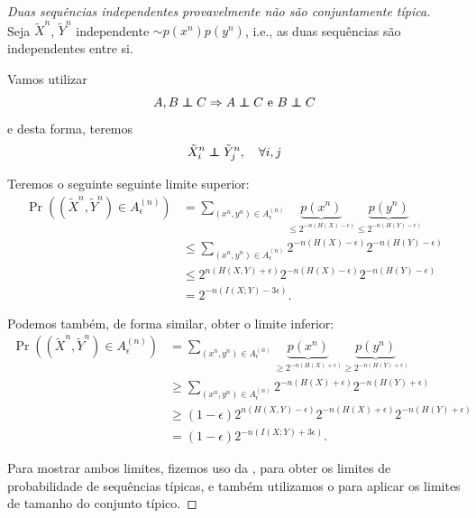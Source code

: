   \begin{proof}[Duas sequências independentes provavelmente não são conjuntamente típica] \ \\

  Seja $\tilde{X}^n$, $\tilde{Y}^n$ independente $\sim p(x^n)p(y^n)$, i.e., as duas sequências
  são independentes entre si.

  Vamos utilizar
  \begin{equation}
  A, B \independent C  \Rightarrow A \independent C \text{ e } B \independent C
  \end{equation}
  e desta forma, teremos
  \begin{equation}
  \tilde{X}_i^n \independent \tilde{Y}_j^n , \quad \forall i,j
  \end{equation}

  Teremos o seguinte seguinte limite superior:
  \begin{subequations}
    \begin{align}
    \Pr \left( (\tilde{X}^n, \tilde{Y}^n) \in A_{\epsilon}^{(n)} \right) &= \sum_{(x^n,y^n) \in A_{\epsilon}^{(n)}} \underbrace{p(x^n)}_{\leq 2^{-n(H(X)-\epsilon)}} \underbrace{p(y^n)}_{\leq 2^{-n(H(Y)-\epsilon)}} \\
                &\leq \sum_{(x^n,y^n) \in A_{\epsilon}^{(n)}} 2^{-n(H(X)-\epsilon)} 2^{-n(H(Y)-\epsilon)}  \\
                &\leq 2^{n(H(X,Y)+\epsilon)} 2^{-n(H(X)-\epsilon)} 2^{-n(H(Y)-\epsilon)} \\
                &= 2^{-n(I(X;Y)-3\epsilon)} .
    \end{align}
  \end{subequations}

  Podemos também, de forma similar, obter o limite inferior:
  \begin{subequations}
    \begin{align}
    \Pr \left( (\tilde{X}^n, \tilde{Y}^n) \in A_{\epsilon}^{(n)} \right) &= \sum_{(x^n,y^n) \in A_{\epsilon}^{(n)}} \underbrace{p(x^n)}_{\geq 2^{-n(H(X)+\epsilon)}} \underbrace{p(y^n)}_{\geq 2^{-n(H(Y)+\epsilon)}} \nonumber \\
                &\geq \sum_{(x^n,y^n) \in A_{\epsilon}^{(n)}} 2^{-n(H(X)+\epsilon)} 2^{-n(H(Y)+\epsilon)} \\
                &\geq (1-\epsilon) 2^{n(H(X,Y)-\epsilon)} 2^{-n(H(X)+\epsilon)} 2^{-n(H(Y)+\epsilon)} \\
                &= (1-\epsilon) 2^{-n(I(X;Y)+3\epsilon)} .
    \end{align}
  \end{subequations}

  Para mostrar ambos limites, fizemos uso da , para obter os limites
  de probabilidade de sequências típicas, e também utilizamos o  para
  aplicar os limites de tamanho do conjunto típico.
\end{proof}


